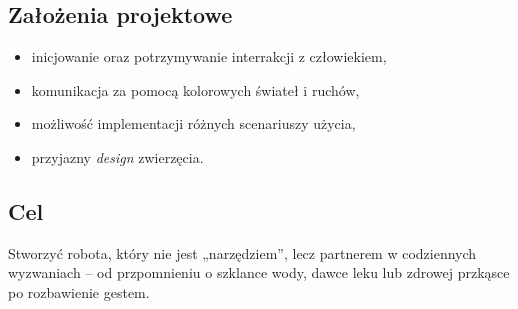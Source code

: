 \documentclass{article}
\begin{document}
        \subsection*{Założenia projektowe}
            \begin{itemize}
                \item inicjowanie oraz potrzymywanie interrakcji z człowiekiem,
                \item komunikacja za pomocą kolorowych świateł i ruchów,
                \item możliwość implementacji różnych scenariuszy użycia,
                \item przyjazny \textit{design} zwierzęcia.
            \end{itemize}

        \subsection*{Cel}
            Stworzyć robota, który nie jest „narzędziem”, lecz partnerem w codziennych wyzwaniach -- od
            przpomnieniu o szklance wody, dawce leku lub zdrowej przkąsce po rozbawienie gestem.
\end{document}
